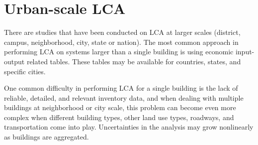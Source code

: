 \documentclass[10pt]{article}
\begin{document}
\section{Urban-scale LCA}

There are studies that have been conducted on LCA at larger scales (district, campus, neighborhood, city, state or nation). The most common approach in performing LCA on systems larger than a single building is using economic input-output related tables. These tables may be available for countries, states, and specific cities. 

One common difficulty in performing LCA for a single building is the lack of reliable, detailed, and relevant inventory data, and when dealing with multiple buildings at neighborhood or city scale, this problem can become even more complex when different building types, other land use types, roadways, and transportation come into play. Uncertainties in the analysis may grow nonlinearly as buildings are aggregated. 





\end{document}
